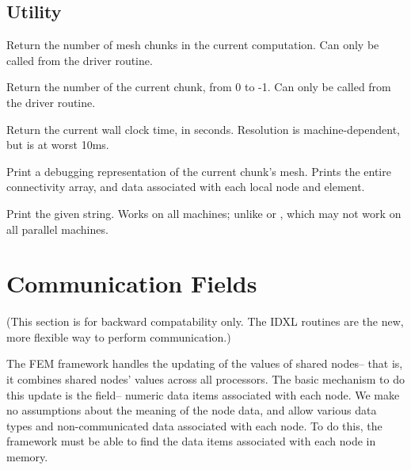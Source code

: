 \documentclass[10pt]{article}
\begin{document}
\subsection{Utility}


     Return the number of mesh chunks in the current computation.  Can
     only be called from the driver routine.


     Return the number of the current chunk, from 0 to
     -1.  Can only be called from the driver routine.


     Return the current wall clock time, in seconds.  Resolution is
     machine-dependent, but is at worst 10ms.


     Print a debugging representation of the current chunk's mesh.
     Prints the entire connectivity array, and data associated with
     each local node and element.


     Print the given string.  Works on all machines; unlike  or
     , which may not work on all parallel machines.






\section{Communication Fields}

(This section is for backward compatability only.  The IDXL routines
are the new, more flexible way to perform communication.)

The FEM framework handles the updating of the values of shared nodes-- that
is, it combines shared nodes' values across all processors.  The basic
mechanism to do this update is the field-- numeric data items associated
with each node. We make no assumptions about the meaning of the node data,
and allow various data types and non-communicated data associated with each
node.  To do this, the framework must be able to find the data items
associated with each node in memory.
\end{document}

